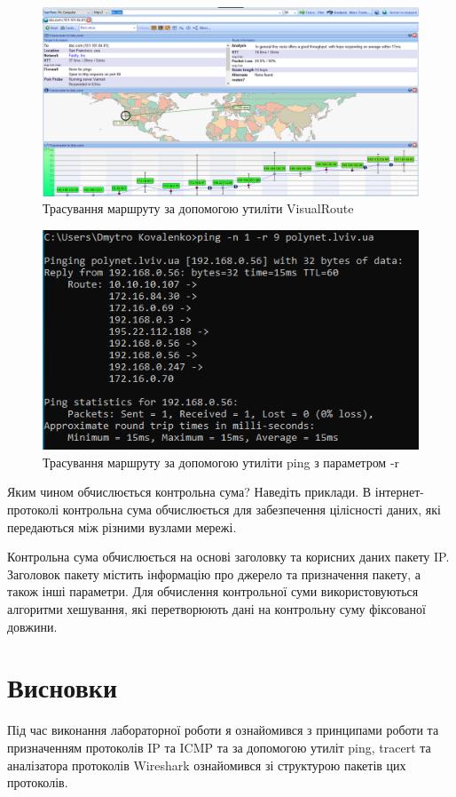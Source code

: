 \documentclass{article}
\begin{document}
\begin{normalsize}
\begin{figure}[H]
	\centering
	\includegraphics[scale=0.35]{t2}
	\caption{Трасування маршруту за допомогою утиліти VisualRoute}
\end{figure}

\begin{figure}[H]
	\centering
	\includegraphics[scale=0.8]{3}
	\caption{Трасування маршруту за допомогою утиліти ping з параметром -r}
\end{figure}

Яким чином обчислюється контрольна сума? Наведіть приклади.
В інтернет-протоколі контрольна сума обчислюється для забезпечення цілісності даних, які передаються між різними вузлами мережі.

Контрольна сума обчислюється на основі заголовку та корисних даних пакету IP. Заголовок пакету містить інформацію про джерело та призначення пакету, а також інші параметри. Для обчислення контрольної суми використовуються алгоритми хешування, які перетворюють дані на контрольну суму фіксованої довжини.

\section*{Висновки}
Під час виконання лабораторної роботи я ознайомився з принципами роботи та призначенням протоколів IP та ICMP та за допомогою утиліт ping, tracert та аналізатора протоколів Wireshark ознайомився зі структурою пакетів цих протоколів.
	    
\end{normalsize}
\end{document}
